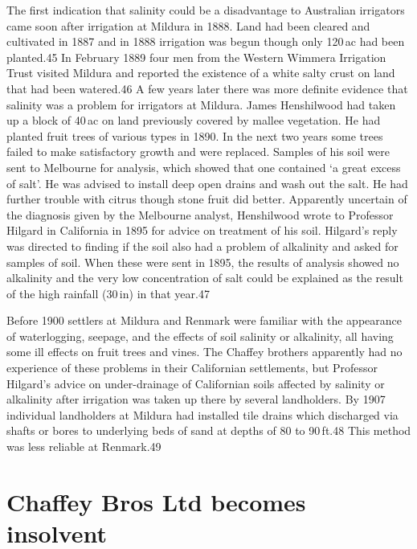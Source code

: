 The first indication that salinity could be a disadvantage to
Australian irrigators came soon after irrigation at Mildura in 1888.
Land had been cleared and cultivated in 1887 and in 1888 irrigation
was begun though only 120\,ac had been planted.45 In February 1889
four men from the Western Wimmera Irrigation Trust visited Mildura and
reported the existence of a white salty crust on land that had been
watered.46 A few years later there was more definite evidence that
salinity was a problem for irrigators at Mildura. James Henshilwood
had taken up a block of 40\,ac on land previously covered by mallee
vegetation.  He had planted fruit trees of various types in 1890.  In
the next two years some trees failed to make satisfactory growth and
were replaced.  Samples of his soil were sent to Melbourne for
analysis, which showed that one contained `a great excess of salt'.
He was advised to install deep open drains and wash out the salt.  He
had further trouble with citrus though stone fruit did better.
Apparently uncertain of the diagnosis given by the Melbourne analyst,
Henshilwood wrote to Professor Hilgard in California in 1895 for
advice on treatment of his soil.  Hilgard's reply was directed to
finding if the soil also had a problem of alkalinity and asked for
samples of soil.  When these were sent in 1895, the results of
analysis showed no alkalinity and the very low concentration of salt
could be explained as the result of the high rainfall (30\,in) in that
year.47

Before 1900 settlers at Mildura and Renmark were familiar with the
appearance of waterlogging, seepage, and the effects of soil salinity
or alkalinity, all having some ill effects on fruit trees and
vines.  The Chaffey brothers apparently had no experience of these
problems in their Californian settlements, but Professor Hilgard's
advice on under-drainage of Californian soils affected by salinity or
alkalinity after irrigation was taken up there by several
landholders.  By 1907 individual landholders at Mildura had installed
tile drains which discharged via shafts or bores to underlying beds of
sand at depths of 80 to 90\,ft.48 This method was less reliable at
Renmark.49

\section{Chaffey Bros Ltd becomes insolvent}

